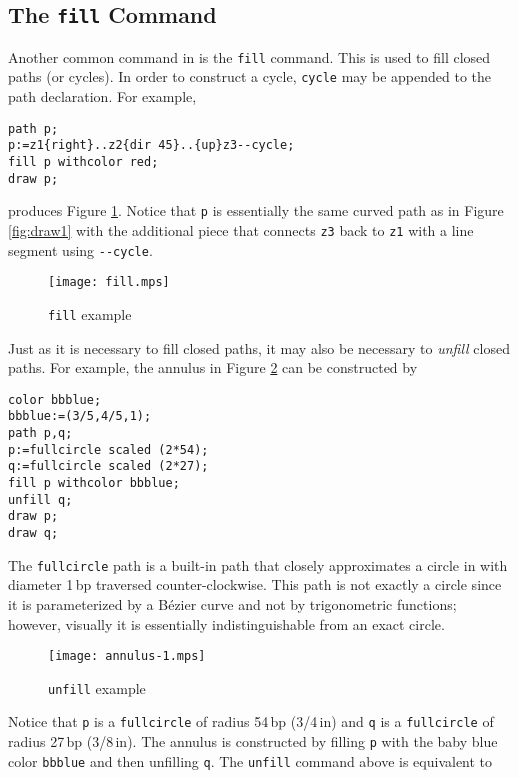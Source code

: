 \subsection{The \texttt{fill} Command}

Another common command in \MP{} is the \texttt{fill} command.  This is
used to fill closed paths (or cycles).  In order to construct a cycle,
\texttt{cycle} may be appended to the path declaration.  For example,

\begin{lstlisting}[xleftmargin=7bp]
path p;
p:=z1{right}..z2{dir 45}..{up}z3--cycle;
fill p withcolor red;
draw p;
\end{lstlisting}

produces Figure \ref{fig:fill}.  Notice that \texttt{p} is essentially
the same curved path as in Figure \ref{fig:draw1} with the additional
piece that connects \texttt{z3} back to \texttt{z1} with a line segment
using \texttt{-{}-cycle}.

\begin{figure}
  \centering
  \texttt{[image: fill.mps]}
  \caption{\texttt{fill} example}
  \label{fig:fill}
\end{figure}

Just as it is necessary to fill closed paths, it may also be necessary
to \textit{unfill} closed paths.  For example, the annulus in Figure
\ref{fig:annulus1} can be constructed by

\begin{lstlisting}[xleftmargin=38bp]
color bbblue;
bbblue:=(3/5,4/5,1);
path p,q;
p:=fullcircle scaled (2*54);
q:=fullcircle scaled (2*27);
fill p withcolor bbblue;
unfill q;
draw p;
draw q;
\end{lstlisting}

The \texttt{fullcircle} path is a built-in path that closely
approximates a circle in \MP{} with diameter 1\,bp traversed
counter-clockwise.  This path is not exactly a circle since it is
parameterized by a B\'{e}zier curve and not by trigonometric functions;
however, visually it is essentially indistinguishable from an exact
circle.

\begin{figure}
  \centering
  \texttt{[image: annulus-1.mps]}
  \caption{\texttt{unfill} example}
  \label{fig:annulus1}
\end{figure}

Notice that \texttt{p} is a \texttt{fullcircle} of radius 54\,bp
(3/4\,in) and \texttt{q} is a \texttt{fullcircle} of radius 27\,bp
(3/8\,in).  The annulus is constructed by filling \texttt{p} with the
baby blue color \texttt{bbblue} and then unfilling \texttt{q}.  The
\texttt{unfill} command above is equivalent to

